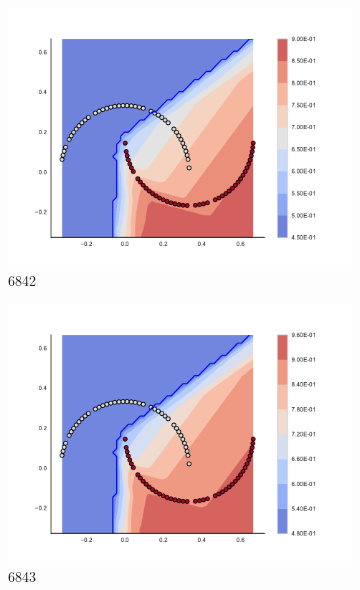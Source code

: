 \begin{figure}[h]
\begin{subfigure}[b]{0.09\textwidth}
    \includegraphics[clip, trim=2.35cm 1.75cm 4.5cm 0cm,width=\textwidth]{img/convergence/6842.pdf}
    \caption{6842}
    \label{fig:convergence_6842}
\end{subfigure}
%
\begin{subfigure}[b]{0.09\textwidth}
    \includegraphics[clip, trim=2.35cm 1.75cm 4.5cm 0cm,width=\textwidth]{img/convergence/6843.pdf}
    \caption{6843}
    \label{fig:convergence_6843}
\end{subfigure}
%
\begin{subfigure}[b]{0.09\textwidth}

\end{subfigure}
\end{figure}
